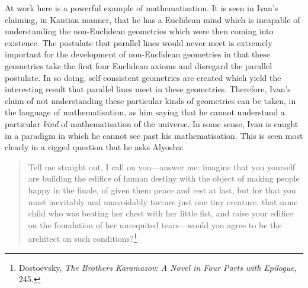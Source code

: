 \documentclass[12pt]{article}
\begin{document}
	At work here is a powerful example of mathematisation. It is seen in Ivan's claiming, in Kantian manner, that he has a Euclidean mind which is incapable of understanding the non-Euclidean geometries which were then coming into existence. The postulate that parallel lines would never meet is extremely important for the development of non-Euclidean geometries in that these geometries take the first four Euclidean axioms and disregard the parallel postulate. In so doing, self-consistent geometries are created which yield the interesting result that parallel lines meet in these geometries. Therefore, Ivan's claim of not understanding these particular kinds of geometries can be taken, in the language of mathematisation, as him saying that he cannot understand a particular \emph{kind} of mathematisation of the universe. In some sense, Ivan is caught in a paradigm in which he cannot see past his mathematisation. This is seen most clearly in a rigged question that he asks Alyosha:
	
	\begin{quote}
	\footnotesize
	\singlespacing
	
	Tell me straight out, I call on you---answer me: imagine that you yourself are building the edifice of human destiny with the object of making people happy in the finale, of given them peace and rest at last, but for that you must inevitably and unavoidably torture just one tiny creature, that same child who was beating her chest with her little fist, and raise your edifice on the foundation of her unrequited tears---would you agree to be the architect on such conditions?\footnote{Dostoevsky, \emph{The Brothers Karamazov: A Novel in Four Parts with Epilogue}, 245.}

	\end{quote}
	
\end{document}
